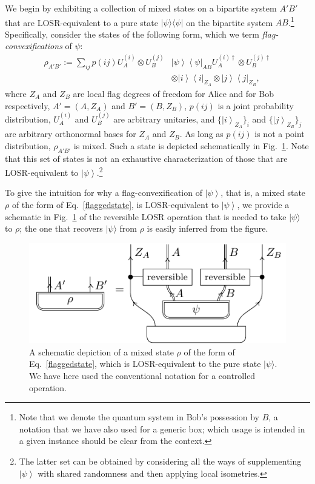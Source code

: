 \documentclass[prx,11pt,letterpaper,twocolumn,accepted=2023-11-27]{quantumarticle}
\newcommand{\ket}[1]{\left| #1 \right>}
\newcommand{\bra}[1]{\left< #1 \right|}
\theoremstyle{plain}
\theoremstyle{definition}
\begin{document}
\begin{appendices}
We begin by exhibiting  a collection of mixed states on a bipartite system $A'B'$ that are LOSR-equivalent to a pure state $|\psi\rangle \langle \psi|$ on the bipartite system $AB$.\footnote{Note that we denote the quantum system in Bob's possession by $B$, a notation that we have also used for a generic box; which usage is intended in a given instance should be clear from the context. } Specifically, consider the states of the following form, which we term {\em flag-convexifications} of $\psi$:
\begin{align}\label{flaggedstate}
\rho_{A'B'} := \sum_{ij} p(i j) U_A^{(i)} \otimes U_B^{(j)} & \ket{\psi} \! \bra{\psi}_{AB} U_A^{ (i)\dagger} \otimes U_B^{ (j)\dagger} 
\nonumber \\ &\otimes \ket{i}\! \bra{i}_{Z_A} \otimes \ket{j}\! \bra{j}_{Z_B},
\end{align}
where $Z_A$ and $Z_B$ are local flag degrees of freedom for Alice and for Bob respectively, $A'=(A,Z_A)$ and $B'=(B,Z_B)$, $p(ij)$ is a joint probability distribution, $U_A^{(i)}$ and $U_B^{(j)}$ are arbitrary unitaries, and $\{ \ket{i}_{Z_A}\}_i$ and $\{ \ket{j}_{Z_B}\}_j$ are arbitrary orthonormal bases for $Z_A$ and $Z_B$.     As long as $p(ij)$ is not a point distribution, 
$\rho_{A'B'}$ is mixed.  Such a state is depicted schematically in Fig.~\ref{NonextremalStates}.
Note that this set of states is not an exhaustive characterization of those that are LOSR-equivalent to $\ket{\psi}$.\footnote{The latter set can be obtained by considering all the ways of supplementing $\ket{\psi}$ with shared randomness and then applying local isometries.}
 


To give the intuition for why a flag-convexification of $\ket{\psi}$, that is, a mixed state $\rho$ of the form of Eq.~\eqref{flaggedstate}, is LOSR-equivalent to $\ket{\psi}$, we provide a schematic in Fig.~\ref{NonextremalStates} of the reversible LOSR operation that is needed to take $|\psi\rangle$ to $\rho$; the one that recovers $|\psi\rangle$ from $\rho$ is easily inferred from the figure.

\begin{figure}[h!]
\centering
    \includegraphics[scale=1]{fig_losr_equiv_control_state.pdf}
    \caption{A schematic depiction of a mixed state $\rho$ of the form of Eq.~\eqref{flaggedstate}, which is LOSR-equivalent to the pure state $|\psi\rangle$.
We have here used the conventional notation for a controlled operation.
    }
    \label{NonextremalStates}
\end{figure}



\end{appendices}
\end{document}
